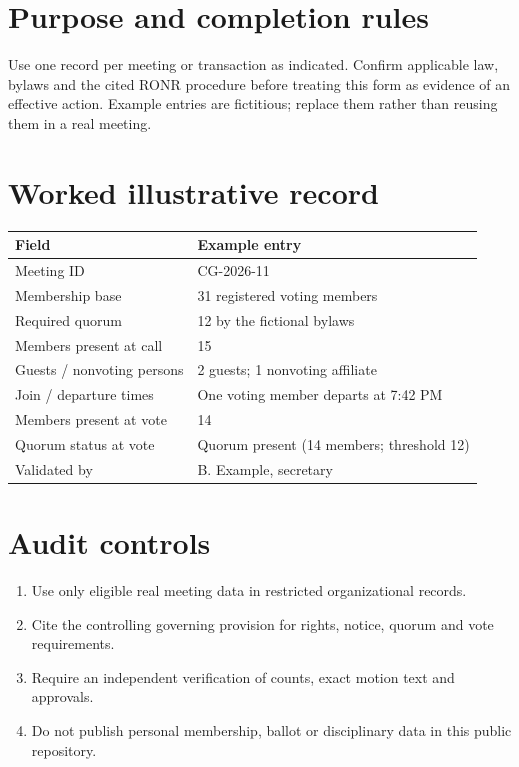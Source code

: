 \documentclass[11pt]{article}
\begin{document}
\SuiteOpen
\section{Purpose and completion rules}
Use one record per meeting or transaction as indicated. Confirm applicable law, bylaws and the cited RONR procedure before treating this form as evidence of an effective action. Example entries are fictitious; replace them rather than reusing them in a real meeting.

\section{Worked illustrative record}
\begin{longtable}{@{}p{.38\linewidth}p{.55\linewidth}@{}}\toprule Field & Example entry\\\midrule\endhead


Meeting ID & CG-2026-11\\
Membership base & 31 registered voting members\\
Required quorum & 12 by the fictional bylaws\\
Members present at call & 15\\
Guests / nonvoting persons & 2 guests; 1 nonvoting affiliate\\
Join / departure times & One voting member departs at 7:42 PM\\
Members present at vote & 14\\
Quorum status at vote & Quorum present (14 members; threshold 12)\\
Validated by & B. Example, secretary\\
\bottomrule\end{longtable}
\section{Audit controls}
\begin{enumerate}[leftmargin=*,itemsep=4pt]
\item Use only eligible real meeting data in restricted organizational records.
\item Cite the controlling governing provision for rights, notice, quorum and vote requirements.
\item Require an independent verification of counts, exact motion text and approvals.
\item Do not publish personal membership, ballot or disciplinary data in this public repository.
\end{enumerate}
\end{document}
